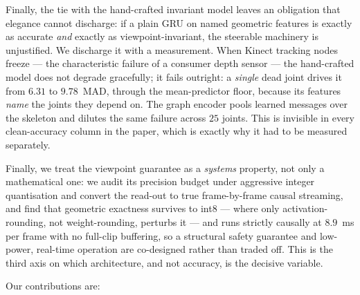 \documentclass[10pt,journal]{IEEEtran}
\begin{document}
Finally, the tie with the hand-crafted invariant model leaves an obligation that elegance cannot discharge: if a plain GRU on named geometric features is exactly as accurate \emph{and} exactly as viewpoint-invariant, the steerable machinery is unjustified. We discharge it with a measurement. When Kinect tracking nodes freeze --- the characteristic failure of a consumer depth sensor --- the hand-crafted model does not degrade gracefully; it fails outright: a \emph{single} dead joint drives it from $6.31$ to $9.78$~MAD, through the mean-predictor floor, because its features \emph{name} the joints they depend on. The graph encoder pools learned messages over the skeleton and dilutes the same failure across $25$ joints. This is invisible in every clean-accuracy column in the paper, which is exactly why it had to be measured separately.

Finally, we treat the viewpoint guarantee as a \emph{systems} property, not only a mathematical one: we audit its precision budget under aggressive integer quantisation and convert the read-out to true frame-by-frame causal streaming, and find that geometric exactness survives to int8 --- where only activation-rounding, not weight-rounding, perturbs it --- and runs strictly causally at $8.9$~ms per frame with no full-clip buffering, so a structural safety guarantee and low-power, real-time operation are co-designed rather than traded off. This is the third axis on which architecture, and not accuracy, is the decisive variable.

Our contributions are:
\end{document}
